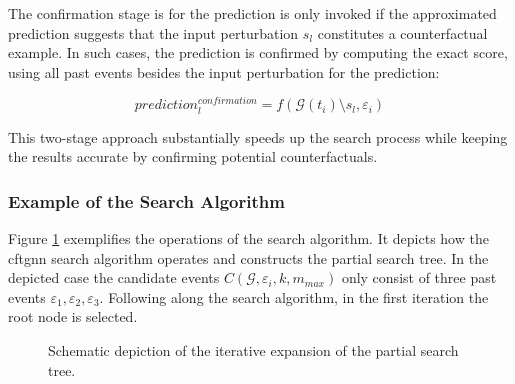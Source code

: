 The confirmation stage is for the prediction is only invoked if the approximated prediction suggests that the input perturbation $s_l$ constitutes a counterfactual example. In such cases, the prediction is confirmed by computing the exact score, using all past events besides the input perturbation for the prediction:

\begin{equation}
    prediction_l^{confirmation} = f(\mathcal{G}(t_i) \setminus s_l, \varepsilon_i)
\end{equation}

This two-stage approach substantially speeds up the search process while keeping the results accurate by confirming potential counterfactuals.

\FloatBarrier
\subsubsection{Example of the Search Algorithm}
\label{s_Methodology_CoDy_Example}

Figure \ref{f_search_example} exemplifies the operations of the search algorithm. It depicts how the \gls{cftgnn} search algorithm operates and constructs the partial search tree. In the depicted case the candidate events ${C(\mathcal{G}, \varepsilon_i, k, m_{max})}$ only consist of three past events $\varepsilon_1, \varepsilon_2, \varepsilon_3$. Following along the search algorithm, in the first iteration the root node is selected. 

\begin{figure}[ht!]
    \centering
    
    \caption{Schematic depiction of the iterative expansion of the partial search tree.}
    \label{f_search_example}
\end{figure}

